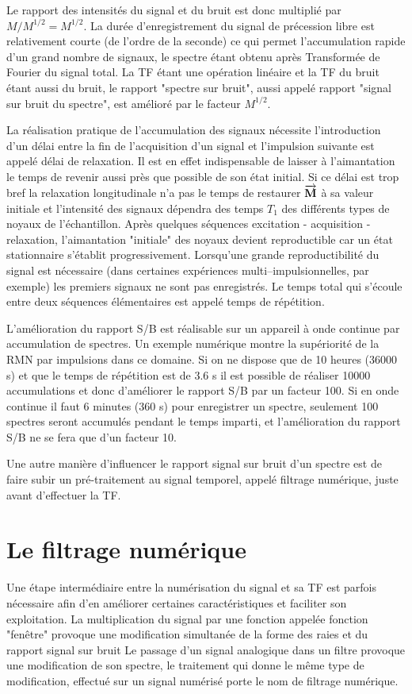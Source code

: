 Le rapport des intensités du signal et du bruit est donc multiplié par $M/M^{1/2}=M^{1/2}$. 
La durée d'enregistrement du signal de précession libre est relativement courte (de 
l'ordre de la seconde) ce qui permet l'accumulation rapide d'un grand nombre de 
signaux, le spectre étant obtenu après Transformée de Fourier du signal total. 
La TF étant une opération linéaire et la TF du bruit étant aussi du bruit, 
le rapport "spectre sur bruit",
aussi appelé rapport "signal sur bruit du spectre", est amélioré par le facteur $M^{1/2}$. 

La réalisation pratique de l'accumulation des signaux nécessite l'introduction d'un délai 
entre la fin de l'acquisition d'un signal et l'impulsion suivante est appelé délai de relaxation. 
Il est en effet indispensable de laisser à l'aimantation le temps de revenir aussi près que 
possible de son état initial. 
Si ce délai est trop bref la relaxation longitudinale n'a pas le 
temps de restaurer $\overrightarrow{\mathbf{M}}$ à sa valeur initiale et l'intensité des signaux dépendra des temps 
$T_1$ des différents types de noyaux de l'échantillon. 
Après quelques séquences excitation - 
acquisition - relaxation, l'aimantation "initiale" des noyaux devient reproductible car un 
état stationnaire s'établit progressivement. 
Lorsqu'une grande reproductibilité du signal 
est nécessaire (dans certaines expériences multi--impulsionnelles, par exemple) 
les premiers signaux ne sont pas enregistrés. 
Le temps total qui s'écoule entre deux 
séquences élémentaires est appelé temps de répétition.

L'amélioration du rapport S/B est réalisable sur un appareil à onde continue par 
accumulation de spectres. Un exemple numérique montre la supériorité de la RMN par 
impulsions dans ce domaine. Si on ne dispose que de 10 heures (36000 s) et que le 
temps de répétition est de 3.6 s il est possible de réaliser 10000 accumulations et donc 
d'améliorer le rapport S/B par un facteur 100. Si en onde continue il faut 6 minutes 
(360 s) pour enregistrer un spectre, seulement 100 spectres seront accumulés pendant le 
temps imparti, et l'amélioration du rapport S/B ne se fera que d'un facteur 10.

Une autre manière d'influencer le rapport signal sur bruit d'un spectre
est de faire subir un pré-traitement au signal temporel, appelé filtrage numérique,
juste avant d'effectuer la TF.

\section{Le filtrage numérique}
\label{filtrage}
Une étape intermédiaire entre la numérisation du signal et sa TF est parfois nécessaire 
afin d'en améliorer certaines caractéristiques et faciliter son exploitation. 
La multiplication du signal par une fonction appelée fonction "fenêtre" provoque une 
modification simultanée de la forme des raies et du rapport signal sur bruit
Le passage d'un signal analogique dans un filtre provoque une modification 
de son spectre, le  traitement qui donne le même type de modification, effectué sur un 
signal numérisé porte le nom de filtrage numérique.

